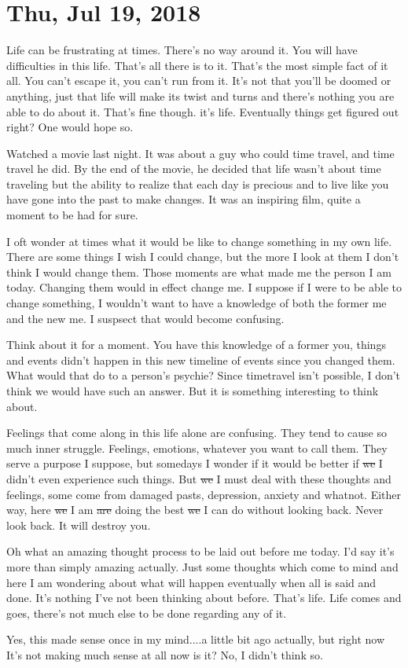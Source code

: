 \section{Thu, Jul 19, 2018}

Life can be frustrating at times. There's no way around it. You will have
difficulties in this life. That's all there is to it. That's the most simple
fact of it all. You can't escape it, you can't run from it. It's not that you'll
be doomed or anything, just that life will make its twist and turns and there's
nothing you are able to do about it. That's fine though. it's life. Eventually
things get figured out right? One would hope so.

Watched a movie last night. It was about a guy who could time travel, and time
travel he did. By the end of the movie, he decided that life wasn't about time
traveling but the ability to realize that each day is precious and to live like
you have gone into the past to make changes. It was an inspiring film, quite a
moment to be had for sure.

I oft wonder at times what it would be like to change something in my own life.
There are some things I wish I could change, but the more I look at them I don't
think I would change them. Those moments are what made me the person I am today.
Changing them would in effect change me. I suppose if I were to be able to
change something, I wouldn't want to have a knowledge of both the former me and
the new me. I suspsect that would become confusing.

Think about it for a moment. You have this knowledge of a former you, things and
events didn't happen in this new timeline of events since you changed them. What
would that do to a person's psychie? Since timetravel isn't possible, I don't
think we would have such an answer. But it is something interesting to think
about.

Feelings that come along in this life alone are confusing. They tend to cause so
much inner struggle. Feelings, emotions, whatever you want to call them. They
serve a purpose I suppose, but somedays I wonder if it would be better if
\st{we} I didn't even experience such things. But \st{we} I must deal with these 
thoughts and feelings, some come from damaged pasts, depression, anxiety and 
whatnot. Either way, here \st{we} I am \st{are} doing the best \st{we} I can do 
without looking back. Never look back. It will destroy you.

Oh what an amazing thought process to be laid out before me today. I'd say it's 
more than simply amazing actually. Just some thoughts which come to mind and here I
am wondering about what will happen eventually when all is said and done. It's
nothing I've not been thinking about before. That's life. Life comes and goes,
there's not much else to be done regarding any of it.

Yes, this made sense once in my mind....a little bit ago actually, but right now It's
not making much sense at all now is it? No, I didn't think so.